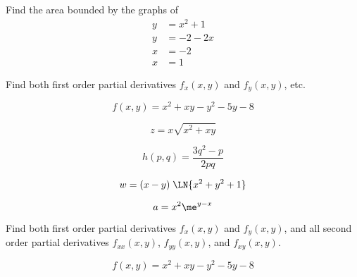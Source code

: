 
Find the area bounded by the graphs of
\begin{align*}
  y &= x^2+1 \\
  y &= -2-2x \\
  x &= -2 \\
  x &= 1
\end{align*}






Find both first order partial derivatives $f_x(x,y)$ and
$f_y(x,y)$, etc.

\bigskip
\begin{equation*}
 f(x, y) = x^2 + x y - y^2 - 5y - 8
\end{equation*}

\vspace{3in}
\begin{equation*}
 z = x \sqrt{x^2 + xy}
\end{equation*}

\newpage
\begin{equation*}
 h(p, q) = \frac{3 q^2 - p}{2 p q}
\end{equation*}

\vspace{2.5in}
\begin{equation*}
 w = (x - y)\;\LN{x^2 + y^2 + 1}
\end{equation*}

\vspace{2.5in}
\begin{equation*}
 a = x^2 \me^{y - x}
\end{equation*}



Find both first order partial derivatives $f_x(x,y)$ and
$f_y(x,y)$, and all second order partial derivatives
$f_{xx}(x,y)$, $f_{yy}(x,y)$, and $f_{xy}(x,y)$.

\bigskip

\begin{equation*}
 f(x, y) = x^2 + x y - y^2 - 5y - 8
\end{equation*}

